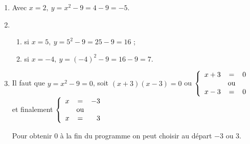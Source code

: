 
\medskip

%

\begin{enumerate}
\item %
Avec $x = 2, \: y = x^2 - 9 = 4 - 9 = - 5$.
\item %
	\begin{enumerate}
		\item %
si $x =  5, \: y = 5^2 - 9 = 25 - 9 = 16$ ;
		\item %
si $x = - 4, \: y = (- 4)^2 - 9 = 16 - 9 = 7$.
	\end{enumerate}
\item  %
Il faut que $y = x^2 - 9 = 0$, soit $(x + 3)(x - 3) = 0$ ou $\left\{\begin{array}{l c l}
x + 3	&=&0\\
		&\text{ou}&\\
x - 3	&=&0
\end{array}\right.$ et finalement $\left\{\begin{array}{l c r}
x	&=&- 3\\
	&\text{ou}&\\
x	&=&3
\end{array}\right.$

Pour obtenir 0 à la fin du programme on peut choisir au départ $- 3$ ou 3.
\end{enumerate}


